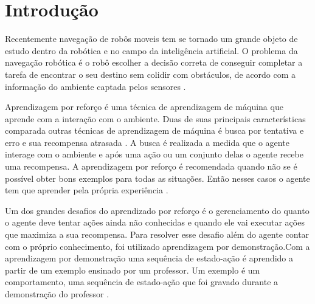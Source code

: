 \documentclass[
	12pt,				%
	openright,			%
	oneside,			%
	a4paper,			%
	brazil,				%
	]{abntex2}
\author{Samuel Cavalcanti\\}
\date{14 de junho de 2019 }
\begin{document}
\frenchspacing 

\imprimircapa

\tableofcontents*
\cleardoublepage



\textual

\chapter{Introdução}
Recentemente navegação de robôs moveis tem se tornado um grande objeto de estudo dentro da robótica e no campo da inteligência artificial. O problema da navegação robótica é  o robô escolher a decisão correta de conseguir completar a tarefa de encontrar o seu destino sem colidir com obstáculos, de acordo com a informação do ambiente captada pelos sensores \cite{duan2005fuzzy}.

Aprendizagem por reforço é uma técnica de aprendizagem de máquina que aprende com a interação com o ambiente. Duas de suas principais características comparada outras técnicas de aprendizagem de máquina é busca por tentativa e erro e sua recompensa atrasada \cite{sutton2018reinforcement}. A busca é realizada a medida que o agente interage com o ambiente e após uma ação ou um conjunto delas o agente recebe uma recompensa. A aprendizagem por reforço é recomendada quando não se é possível obter bons exemplos para todas as situações. Então nesses casos o agente tem que aprender pela própria experiência \cite{zhangreinforcement}.

Um dos grandes desafios do aprendizado por reforço é o gerenciamento do quanto o agente deve tentar ações ainda não conhecidas e quando ele vai executar ações que maximiza a sua recompensa. Para resolver esse desafio além do agente contar com o próprio conhecimento, foi utilizado aprendizagem por demonstração.Com a aprendizagem por demonstração uma sequência de estado-ação é aprendido a partir de um exemplo ensinado por um professor. Um exemplo é um comportamento, uma sequência de estado-ação que foi gravado durante a demonstração do professor \cite{argall2009survey}. 
\end{document}
